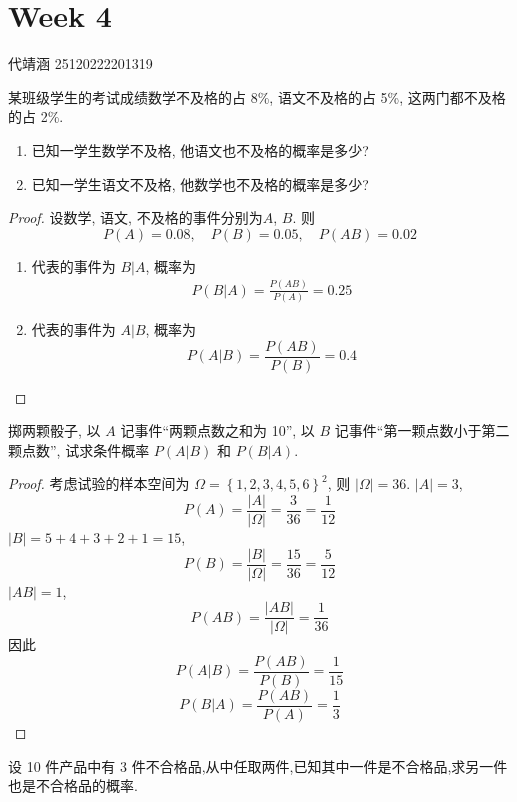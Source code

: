 \documentclass[../main.tex]{subfiles}
\begin{document}
\ifSubfilesClassLoaded{

    
    \setcounter{chapter}{3}
}{}

\chapter{ Week 4 }
代靖涵 25120222201319
\begin{exercise}{}{}
    某班级学生的考试成绩数学不及格的占 8\%, 语文不及格的占 5\%, 这两门都不及格的占 2\%.
\begin{enumerate}
    \item 已知一学生数学不及格, 他语文也不及格的概率是多少?
    \item 已知一学生语文不及格, 他数学也不及格的概率是多少?
\end{enumerate}
\end{exercise}

\begin{proof}
    设数学, 语文, 不及格的事件分别为\(  A  \), \(  B  \). 则 \[
    P\left( A \right)= 0.08,\quad P\left( B \right)= 0 . 0 5  ,\quad P\left( AB \right)= 0.02 
    \]
    \begin{enumerate}
        \item 代表的事件为 \( B|A    \), 概率为 \[
        \begin{aligned}
        P\left( B | A \right)= \frac{P\left( AB \right)  }{P\left( A \right)  }= 0.25   
        \end{aligned}
        \]
        \item 代表的事件为 \(  A|B  \), 概率为 \[
        P\left( A|B \right)= \frac{P\left( AB \right)  }{P\left( B \right)  }= 0.4  
        \]  
    \end{enumerate}
      
\end{proof}
\begin{exercise}{}{}
掷两颗骰子, 以 $A$ 记事件“两颗点数之和为 10”, 以 $B$ 记事件“第一颗点数小于第二颗点数”, 试求条件概率 $P(A|B)$ 和 $P(B|A)$.
\end{exercise}

\begin{proof}
    考虑试验的样本空间为 \(  \Omega =  \left\{ 1,2,3,4,5,6 \right\}^{2}  \), 则 \(  \left|  \Omega  \right|= 36   \). \(  \left| A \right|= 3  \),  \[
    P\left( A \right)= \frac{\left| A \right|  }{\left|  \Omega  \right|  }= \frac{3 }{36 }   = \frac{1 }{12 } 
    \]  \(  \left| B \right|= 5+ 4+ 3+ 2+ 1= 15   \), \[
    P\left( B \right)= \frac{\left| B \right|  }{\left|  \Omega  \right|  }= \frac{15 }{36 }= \frac{5 }{12 }    
    \]  \(  \left| AB \right|=  1  \), \[
    P\left( AB \right)= \frac{\left| AB \right|  }{\left|  \Omega  \right|  }= \frac{1 }{36 }   
    \]因此 \[
    P\left( A|B \right)= \frac{P\left( AB \right)  }{P\left( B \right)  }= \frac{1 }{15 }   
    \] \[
    P\left( B|A \right)= \frac{P\left( AB \right)  }{P\left( A \right)  }= \frac{1 }{3 }   
    \] 
\end{proof}
\begin{exercise}{}{}
设 10 件产品中有 3 件不合格品,从中任取两件,已知其中一件是不合格品,求另一件也是不合格品的概率.
\end{exercise}
\end{document}
